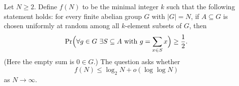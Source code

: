 Let $N\ge 2$.
Define $f(N)$ to be the minimal integer $k$ such that the following statement holds:
for every finite abelian group $G$ with $|G|=N$, if $A\subseteq G$ is chosen uniformly at random among all $k$-element subsets of $G$, then
\[
\Pr\Bigl(\forall g\in G\ \exists S\subseteq A\text{ with } g=\sum_{x\in S} x\Bigr)\ge \frac12.
\]
(Here the empty sum is $0\in G$.)
The question asks whether
\[
 f(N) \le \log_2 N + o(\log\log N)
\]
as $N\to\infty$.
